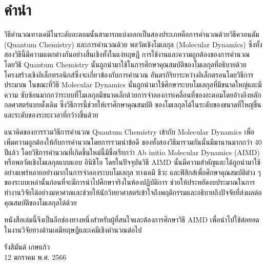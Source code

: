 

{

\chapter*{\centering คำนำ}

วิธีคำนวณทางเคมีในระดับอะตอมนั้นสามารถแบ่งออกเป็นสองประเภทคือการคำนวณด้วยวิธีควอนตัม (Quantum Chemistry) และการคำนวณด้วย%
พลวัตเชิงโมเลกุล (Molecular Dynamics) ซึ่งทั้งสองวิธีนี้มีความแตกต่างกันอย่างสิ้นเชิงทั้งในแง่ทฤษฎี การใช้งานและความถูกต้องของการคำนวณ 
โดยวิธี Quantum Chemistry นั้นถูกนำมาใช้ในการศึกษาคุณสมบัติของโมเลกุลที่อธิบายด้วยโครงสร้างเชิงอิเล็กทรอนิกส์ซึ่งจะเกี่ยวข้องกับการคำนวณ%
อันตรกิริยาระหว่างอิเล็กตรอนโดยวิธีการประมาณ ในขณะที่วิธี Molecular Dynamics นั้นถูกนำมาใช้ศึกษาระบบโมเลกุลที่มีขนาดใหญ่และมีความ%
ซับซ้อนมากกว่าระบบที่โมเลกุลมีขนาดเล็กด้วยการจำลองการเคลื่อนที่ของอะตอมโดยอ้างอิงหลักกลศาสตร์แบบดั้งเดิม ซึ่งวิธีการนี้ช่วยให้เราศึกษาคุณสมบัติ%
ของโมเลกุลได้ในระดับของขนาดที่ใหญ่ขึ้นและระดับของระยะเวลาที่กว้างขึ้นด้วย

แนวคิดของการรวมวิธีการคำนวณ Quantum Chemistry เข้ากับ Molecular Dynamics เพื่อเพิ่มความถูกต้องให้กับการคำนวณโดยการรวมนำข้อดี%
ของทั้งสองวิธีมารวมกันนั้นมีมานานมากกว่า 40 ปีแล้ว โดยวิธีการคำนวณที่เกิดขึ้นใหม่นี้มีชื่อเรียกว่า Ab initio Molecular Dynamics (AIMD) 
หรือพลวัตเชิงโมเลกุลแบบแอบ อินิชิโอ โดยในปัจจุบันวิธี AIMD นั้นมีความสำคัญและได้ถูกนำมาใช้อย่างแพร่หลายอย่างมากในการจำลองระบบโมเลกุล%
ทางเคมี ชีวะ และฟิสิกส์เพื่อศึกษาคุณสมบัติต่าง ๆ ของระบบเหล่านั้นก่อนที่จะมีการนำไปศึกษาจริงในห้องปฏิบัติการ ช่วยให้ประหยัดงบประมาณในการ%
ทำงานวิจัยได้อย่างมหาศาลและช่วยให้นักวิทยาศาสตร์เข้าใจถึงพฤติกรรมและอธิบายถึงปัจจัยที่ส่งผลต่อคุณสมบัติของโมเลกุลได้ด้วย 

หนังสือเล่มนี้จึงเป็นอีกช่องทางหนึ่งสำหรับผู้ที่สนใจและต้องการศึกษาวิธี AIMD เพื่อนำไปใช้ต่อยอดในงานวิจัยทางด้านเคมีทฤษฎีและเคมีเชิงคำนวณต่อไป

\medskip

\begin{flushright}
รังสิมันต์ เกษแก้ว \\
12 มกราคม พ.ศ. 2566
\end{flushright}
}
